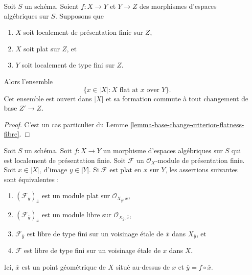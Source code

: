 \begin{lemma}
\label{lemma-base-change-flatness-fibres}
Soit $S$ un schéma.
Soient $f : X \to Y$ et $Y \to Z$ des morphismes d'espaces algébriques sur $S$.
Supposons que
\begin{enumerate}
\item $X$ soit localement de présentation finie sur $Z$,
\item $X$ soit plat sur $Z$, et
\item $Y$ soit localement de type fini sur $Z$.
\end{enumerate}
Alors l'ensemble
$$
\{x \in |X| : X\text{ flat at }x \text{ over }Y\}.
$$
Cet ensemble est ouvert dans $|X|$ et sa formation commute à tout changement de base
$Z' \to Z$.
\end{lemma}

\begin{proof}
C'est un cas particulier du
Lemme \ref{lemma-base-change-criterion-flatness-fibre}.
\end{proof}

\begin{lemma}
\label{lemma-flat-and-free-at-point-fibre}
Soit $S$ un schéma. Soit $f : X \to Y$ un morphisme d'espaces algébriques
sur $S$ qui est localement de présentation finie.
Soit $\mathcal{F}$ un $\mathcal{O}_X$-module de présentation finie.
Soit $x \in |X|$, d'image $y \in |Y|$. Si $\mathcal{F}$ est plat en $x$
sur $Y$, les assertions suivantes sont équivalentes :
\begin{enumerate}
\item $(\mathcal{F}_{\overline{y}})_{\overline{x}}$ est un module plat sur
$\mathcal{O}_{X_{\overline{y}}, \overline{x}}$,
\item $(\mathcal{F}_{\overline{y}})_{\overline{x}}$ est un module libre sur
$\mathcal{O}_{X_{\overline{y}}, \overline{x}}$,
\item $\mathcal{F}_{\overline{y}}$ est libre de type fini sur un
voisinage étale de $\overline{x}$ dans $X_{\overline{y}}$, et
\item $\mathcal{F}$ est libre de type fini sur un voisinage étale de $x$ dans $X$.
\end{enumerate}
Ici, $\overline{x}$ est un point géométrique de $X$ situé au-dessus de $x$
et $\overline{y} = f \circ \overline{x}$.
\end{lemma}

